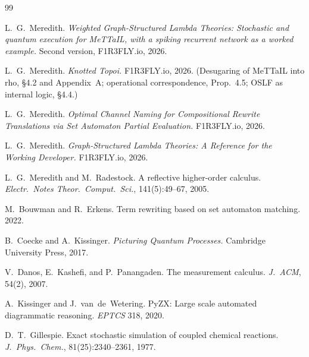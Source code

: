 \documentclass[11pt]{article}
\theoremstyle{definition}
\theoremstyle{plain}
\begin{document}
\begin{thebibliography}{99}

 L.~G.~Meredith. \emph{Weighted Graph-Structured Lambda Theories: Stochastic and
quantum execution for MeTTaIL, with a spiking recurrent network as a worked example.} Second
version, F1R3FLY.io, 2026.

 L.~G.~Meredith. \emph{Knotted Topoi.} F1R3FLY.io, 2026. (Desugaring of MeTTaIL
into rho, \S4.2 and Appendix~A; operational correspondence, Prop.~4.5; OSLF as internal logic,
\S4.4.)

 L.~G.~Meredith. \emph{Optimal Channel Naming for Compositional Rewrite
Translations via Set Automaton Partial Evaluation.} F1R3FLY.io, 2026.

 L.~G.~Meredith. \emph{Graph-Structured Lambda Theories: A Reference for the
Working Developer.} F1R3FLY.io, 2026.

 L.~G.~Meredith and M.~Radestock. A reflective higher-order calculus.
\emph{Electr.\ Notes Theor.\ Comput.\ Sci.}, 141(5):49--67, 2005.

 M.~Bouwman and R.~Erkens. Term rewriting based on set automaton matching.
2022.

 B.~Coecke and A.~Kissinger. \emph{Picturing Quantum Processes.}
Cambridge University Press, 2017.

 V.~Danos, E.~Kashefi, and P.~Panangaden. The measurement calculus. \emph{J.\ ACM},
54(2), 2007.

 A.~Kissinger and J.~van~de~Wetering. PyZX: Large scale automated diagrammatic
reasoning. \emph{EPTCS} 318, 2020.

 D.~T.~Gillespie. Exact stochastic simulation of coupled chemical reactions.
\emph{J.\ Phys.\ Chem.}, 81(25):2340--2361, 1977.

\end{thebibliography}
\end{document}

